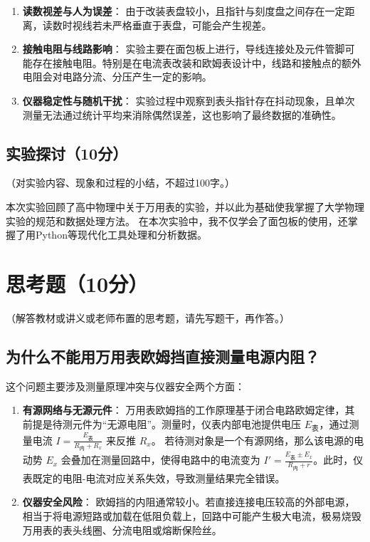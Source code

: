 \documentclass{../template/Report}%
\begin{document}
\begin{fullreportonly}
\begin{enumerate}
        \item \textbf{读数视差与人为误差}：
              由于改装表盘较小，且指针与刻度盘之间存在一定距离，读数时视线若未严格垂直于表盘，可能会产生视差。

        \item \textbf{接触电阻与线路影响}：
              实验主要在面包板上进行，导线连接处及元件管脚可能存在接触电阻。特别是在电流表改装和欧姆表设计中，线路和接触点的额外电阻会对电路分流、分压产生一定的影响。

        \item \textbf{仪器稳定性与随机干扰}：
              实验过程中观察到表头指针存在抖动现象，且单次测量无法通过统计平均来消除偶然误差，这也影响了最终数据的准确性。
    \end{enumerate}
    \subsection{实验探讨（10分）}
    （对实验内容、现象和过程的小结，不超过100字。）


    本次实验回顾了高中物理中关于万用表的实验，并以此为基础使我掌握了大学物理实验的规范和数据处理方法。
    在本次实验中，我不仅学会了面包板的使用，还掌握了用Python等现代化工具处理和分析数据。

    \section{思考题（10分）}
    （解答教材或讲义或老师布置的思考题，请先写题干，再作答。）

    \subsection{为什么不能用万用表欧姆挡直接测量电源内阻？}
    这个问题主要涉及测量原理冲突与仪器安全两个方面：
    \begin{enumerate}
        \item \textbf{有源网络与无源元件}：
              万用表欧姆挡的工作原理基于闭合电路欧姆定律，其前提是待测元件为“无源电阻”。测量时，仪表内部电池提供电压 $E_{\text{表}}$，通过测量电流 $I = \frac{E_{\text{表}}}{R_{\text{内}} + R_x}$ 来反推 $R_x$。
              若待测对象是一个有源网络，那么该电源的电动势 $E_x$ 会叠加在测量回路中，使得电路中的电流变为 $I' = \frac{E_{\text{表}} \pm E_x}{R_{\text{内}} + r}$。此时，仪表既定的电阻-电流对应关系失效，导致测量结果完全错误。

        \item \textbf{仪器安全风险}：
              欧姆挡的内阻通常较小。若直接连接电压较高的外部电源，相当于将电源短路或加载在低阻负载上，回路中可能产生极大电流，极易烧毁万用表的表头线圈、分流电阻或熔断保险丝。
    \end{enumerate}


\end{fullreportonly}
\end{document}
